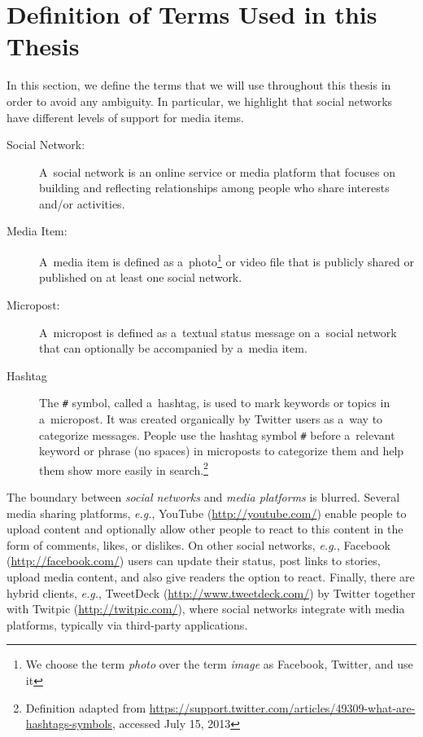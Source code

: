 \section{Definition of Terms Used in this Thesis}
\label{sec:definition}

In this section, we define the terms
that we will use throughout this thesis
in order to avoid any ambiguity.
In particular, we highlight that social networks have
different levels of support for media items.

\begin{description}
  \item[Social Network:]
       A~social network is an online service or media platform
       that focuses on building and reflecting
       relationships among people
       who share interests and/or activities.
  \item[Media Item:]
       A~media item is defined as
       a~photo\footnote{We choose the term \emph{photo}
       over the term \emph{image} as
       Facebook, Twitter, and \googleplus use it}
       or video file that is publicly shared or published
       on at least one social network.
  \item[Micropost:]
       A~micropost is defined as a~textual status message
        on a~social network
       that can optionally be accompanied by a~media item.
  \item[Hashtag] The \texttt{\#} symbol, called a~hashtag,
       is used to mark keywords or topics in a~micropost.
       It was created organically by Twitter users
       as a~way to categorize messages.
       People use the hashtag symbol \texttt{\#} before a~relevant keyword
       or phrase (no spaces) in microposts to categorize them
       and help them show more easily in
       search.\footnote{Definition adapted from
       \url{https://support.twitter.com/articles/49309-what-are-hashtags-symbols},
       accessed July 15, 2013}
\end{description}

The boundary between \emph{social networks} and
\emph{media platforms} is blurred.
Several media sharing platforms, \emph{e.g.},
YouTube (\url{http://youtube.com/})
enable people to upload content
and optionally allow other people to react
to this content in the form of comments, likes, or dislikes.
On other social networks, \emph{e.g.},
Facebook (\url{http://facebook.com/})
users can update their status, post links to stories,
upload media content, and also give readers the option to react.
Finally, there are hybrid clients, \emph{e.g.},
TweetDeck (\url{http://www.tweetdeck.com/})
by Twitter together with
Twitpic (\url{http://twitpic.com/}),
where social networks integrate with media platforms,
typically via third-party applications.

